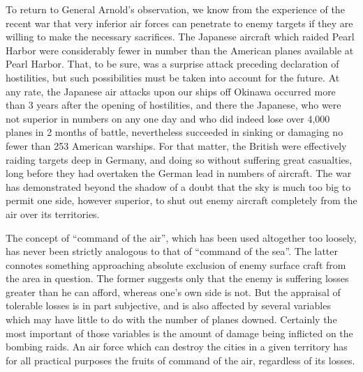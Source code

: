 To return to General Arnold's observation, we know from the experience of the recent war that very inferior air forces can penetrate to enemy targets if they are willing to make the necessary sacrifices. The Japanese aircraft which raided Pearl Harbor were considerably fewer in number than the American planes available at Pearl Harbor. That, to be sure, was a surprise attack preceding declaration of hostilities, but such possibilities must be taken into account for the future. At any rate, the Japanese air attacks upon our ships off Okinawa occurred more than 3 years after the opening of hostilities, and there the Japanese, who were not superior in numbers on any one day and who did indeed lose over 4,000 planes in 2 months of battle, nevertheless succeeded in sinking or damaging no fewer than 253 American warships. For that matter, the British were effectively raiding targets deep in Germany, and doing so without suffering great casualties, long before they had overtaken the German lead in numbers of aircraft. The war has demonstrated beyond the shadow of a doubt that the sky is much too big to permit one side, however superior, to shut out enemy aircraft completely from the air over its territories.

The concept of ``command of the air'', which has been used altogether too loosely, has never been strictly analogous to that of ``command of the sea''. The latter connotes something approaching absolute exclusion of enemy surface craft from the area in question. The former suggests only that the enemy is suffering losses greater than he can afford, whereas one's own side is not. But the appraisal of tolerable losses is in part subjective, and is also affected by several variables which may have little to do with the number of planes downed. Certainly the most important of those variables is the amount of damage being inflicted on the bombing raids. An air force which can destroy the cities in a given territory has for all practical purposes the fruits of command of the air, regardless of its losses.

